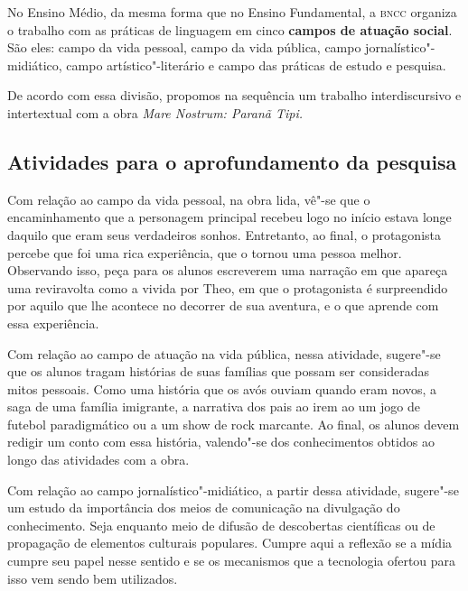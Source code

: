 \documentclass[12pt]{extarticle}
\begin{document}




No Ensino Médio, da mesma forma que no Ensino Fundamental, a \textsc{bncc}
organiza o trabalho com as práticas de linguagem em cinco \textbf{campos
de atuação social}. São eles: campo da vida pessoal, campo da vida
pública, campo jornalístico"-midiático, campo artístico"-literário e campo
das práticas de estudo e pesquisa.

De acordo com essa divisão, propomos na sequência um trabalho
interdiscursivo e intertextual com a obra \emph{Mare Nostrum: Paranã
Tipi.}

\subsection{Atividades para o aprofundamento da pesquisa}

Com relação ao campo da vida pessoal, na obra lida, vê"-se que o encaminhamento que a personagem principal
  recebeu logo no início estava longe daquilo que eram seus verdadeiros
  sonhos. Entretanto, ao final, o protagonista percebe que foi uma rica
  experiência, que o tornou uma pessoa melhor. Observando isso, peça para os alunos
  escreverem uma narração em que apareça uma reviravolta como a vivida
  por Theo, em que o protagonista é surpreendido por aquilo que lhe
  acontece no decorrer de sua aventura, e o que aprende com essa
  experiência.

Com relação ao campo de atuação na vida pública, 
  nessa atividade, sugere"-se que os alunos tragam histórias de suas
  famílias que possam ser consideradas mitos pessoais. Como uma história
  que os avós ouviam quando eram novos, a saga de uma família imigrante,
  a narrativa dos pais ao irem ao um jogo de futebol paradigmático ou a
  um show de rock marcante. Ao final, os alunos devem redigir um conto
  com essa história, valendo"-se dos conhecimentos obtidos ao longo das
  atividades com a obra.

Com relação ao campo jornalístico"-midiático, a partir dessa atividade, 
sugere"-se um estudo da importância dos meios
  de comunicação na divulgação do conhecimento. Seja enquanto meio de
  difusão de descobertas científicas ou de propagação de elementos
  culturais populares. Cumpre aqui a reflexão se a mídia cumpre seu
  papel nesse sentido e se os mecanismos que a tecnologia ofertou para
  isso vem sendo bem utilizados.
\end{document}
